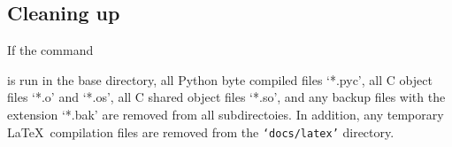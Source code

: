 \subsection{Cleaning up}

If the command


is run in the base directory, all Python byte compiled files `*.pyc', all C object files `*.o' and `*.os', all C shared object files `*.so', and any backup files with the extension `*.bak' are removed from all subdirectoies.  In addition, any temporary \LaTeX\ compilation files are removed from the \texttt{`docs/latex'} directory.
